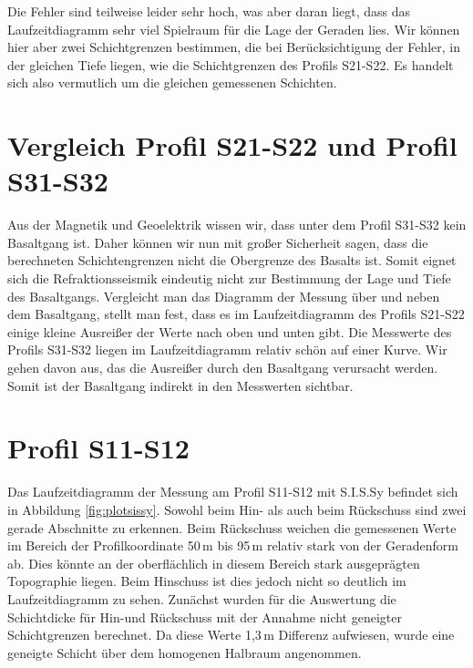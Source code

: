 



Die Fehler sind teilweise leider sehr hoch, was aber daran liegt, dass das Laufzeitdiagramm sehr viel Spielraum für die Lage der Geraden lies. 
Wir können hier aber zwei Schichtgrenzen bestimmen, die bei Berücksichtigung der Fehler, in der gleichen Tiefe liegen, wie die Schichtgrenzen des Profils S21-S22. Es handelt sich also vermutlich um die gleichen gemessenen Schichten.

\section{Vergleich Profil S21-S22 und Profil S31-S32}

Aus der Magnetik und Geoelektrik wissen wir, dass unter dem Profil S31-S32 kein Basaltgang ist. Daher können wir nun mit großer Sicherheit sagen, dass die berechneten Schichtengrenzen nicht die Obergrenze des Basalts ist. Somit eignet sich die Refraktionsseismik eindeutig nicht zur Bestimmung der Lage und Tiefe des Basaltgangs. Vergleicht man das Diagramm der Messung über und neben dem Basaltgang, stellt man fest, dass es im Laufzeitdiagramm des Profils S21-S22 einige kleine Ausreißer der Werte nach oben und unten gibt. Die Messwerte des Profils S31-S32 liegen im Laufzeitdiagramm relativ schön auf einer Kurve. Wir gehen davon aus, das die Ausreißer durch den Basaltgang verursacht werden. Somit ist der Basaltgang indirekt in den Messwerten sichtbar.

\section{Profil S11-S12}

Das Laufzeitdiagramm der Messung am Profil S11-S12 mit S.I.S.Sy befindet sich in Abbildung \ref{fig:plotsissy}. Sowohl beim Hin- als auch beim Rückschuss sind zwei gerade Abschnitte zu erkennen. Beim Rückschuss weichen die gemessenen Werte im Bereich der Profilkoordinate 50\,m bis 95\,m relativ stark von der Geradenform ab. Dies könnte an der oberflächlich in diesem Bereich stark ausgeprägten Topographie liegen. Beim Hinschuss ist dies jedoch nicht so deutlich im Laufzeitdiagramm zu sehen. Zunächst wurden für die Auswertung die Schichtdicke für Hin-und Rückschuss mit der Annahme nicht geneigter Schichtgrenzen berechnet. Da diese Werte 1,3\,m Differenz aufwiesen, wurde eine geneigte Schicht über dem homogenen Halbraum angenommen.

